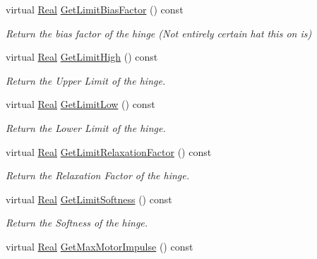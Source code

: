 \begin{DoxyCompactItemize}
virtual \hyperlink{namespacephys_af7eb897198d265b8e868f45240230d5f}{Real} \hyperlink{classphys_1_1HingeConstraint_a2c3b1f4f5242b35ddb9b9e9d00f76812}{GetLimitBiasFactor} () const 
\begin{DoxyCompactList}\small\item\em Return the bias factor of the hinge (Not entirely certain hat this on is) \item\end{DoxyCompactList}\item 
virtual \hyperlink{namespacephys_af7eb897198d265b8e868f45240230d5f}{Real} \hyperlink{classphys_1_1HingeConstraint_ae633b31c347af338042e87738d7694ff}{GetLimitHigh} () const 
\begin{DoxyCompactList}\small\item\em Return the Upper Limit of the hinge. \item\end{DoxyCompactList}\item 
virtual \hyperlink{namespacephys_af7eb897198d265b8e868f45240230d5f}{Real} \hyperlink{classphys_1_1HingeConstraint_a2e467d00131cbfd61070c10749403546}{GetLimitLow} () const 
\begin{DoxyCompactList}\small\item\em Return the Lower Limit of the hinge. \item\end{DoxyCompactList}\item 
virtual \hyperlink{namespacephys_af7eb897198d265b8e868f45240230d5f}{Real} \hyperlink{classphys_1_1HingeConstraint_a65bfeef0326cd74fd3209940f5a14bbc}{GetLimitRelaxationFactor} () const 
\begin{DoxyCompactList}\small\item\em Return the Relaxation Factor of the hinge. \item\end{DoxyCompactList}\item 
virtual \hyperlink{namespacephys_af7eb897198d265b8e868f45240230d5f}{Real} \hyperlink{classphys_1_1HingeConstraint_a9c87c6f21dd7959cfb5c3c7a63014171}{GetLimitSoftness} () const 
\begin{DoxyCompactList}\small\item\em Return the Softness of the hinge. \item\end{DoxyCompactList}\item 
virtual \hyperlink{namespacephys_af7eb897198d265b8e868f45240230d5f}{Real} \hyperlink{classphys_1_1HingeConstraint_a954621d35173f9de5d7f44760559040e}{GetMaxMotorImpulse} () const 

\end{DoxyCompactItemize}
